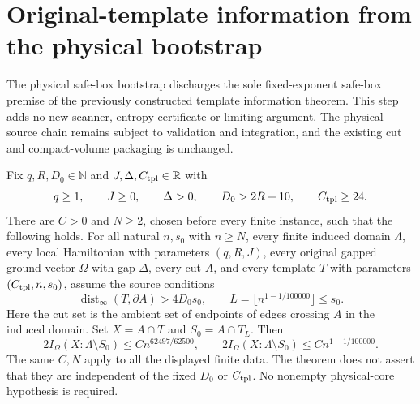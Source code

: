 \section{Original-template information from the physical bootstrap}
\label{sec:physical-template-information}

The physical safe-box bootstrap discharges the sole fixed-exponent
safe-box premise of the previously constructed template information
theorem.  This step adds no new scanner, entropy certificate or limiting
argument.  The physical source chain remains subject to validation and
integration, and the existing cut and compact-volume packaging is unchanged.

\begin{lemma}
    \label{thm:physical-template-information}
    \leanok
    Fix $q,R,D_0\in\mathbb N$ and $J,\Delta,C_{\rm tpl}\in\mathbb R$ with
    \[
        q\geq1,\qquad J\geq0,\qquad\Delta>0,\qquad
        D_0>2R+10,\qquad C_{\rm tpl}\geq24.
    \]
    There are $C>0$ and $N\geq2$, chosen before every finite instance,
    such that the following holds.  For all natural $n,s_0$ with $n\geq N$,
    every finite induced domain $\Lambda$, every local Hamiltonian with
    parameters $(q,R,J)$, every original gapped ground vector $\Omega$
    with gap $\Delta$, every cut $A$, and every template $T$ with parameters
    $(C_{\rm tpl},n,s_0)$, assume the source conditions
    \[
        \operatorname{dist}_\infty(T,\partial A)>4D_0s_0,
        \qquad L=\lfloor n^{1-1/100000}\rfloor\leq s_0.
    \]
    Here the cut set is the ambient set of endpoints of edges crossing $A$
    in the induced domain.  Set $X=A\cap T$ and $S_0=A\cap T_L$.
    Then
    \[
        2I_\Omega(X:\Lambda\setminus S_0)\leq Cn^{62497/62500},\qquad
        2I_\Omega(X:\Lambda\setminus S_0)\leq Cn^{1-1/100000}.
    \]
    The same $C,N$ apply to all the displayed finite data.  The theorem
    does not assert that they are independent of the fixed $D_0$ or
    $C_{\rm tpl}$.  No nonempty physical-core hypothesis is required.
\end{lemma}

